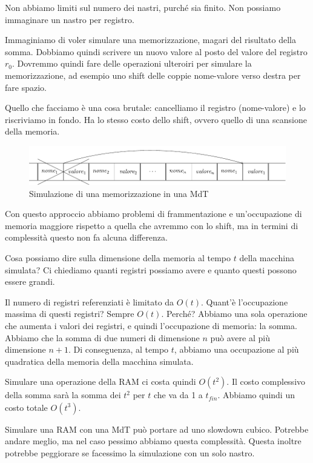 Non abbiamo limiti sul numero dei nastri, purché sia finito. Non possiamo immaginare un nastro per
registro.

Immaginiamo di voler simulare una memorizzazione, magari del risultato della somma. Dobbiamo quindi
scrivere un nuovo valore al posto del valore del registro $r_{0}$. Dovremmo quindi fare delle
operazioni ulteroiri per simulare la memorizzazione, ad esempio uno shift delle coppie nome-valore
verso destra per fare spazio.

Quello che facciamo è una cosa brutale: cancelliamo il registro (nome-valore) e lo riscriviamo in
fondo. Ha lo stesso costo dello shift, ovvero quello di una scansione della memoria.

\begin{figure}[h]
    \begin{center}
        \includegraphics[scale=0.75]{./img/deterministic_complexity_classes/RAMstore.pdf}
        \caption{Simulazione di una memorizzazione in una MdT}
    \end{center}
\end{figure}

Con questo approccio abbiamo problemi di frammentazione e un'occupazione di memoria maggiore
rispetto a quella che avremmo con lo shift, ma in termini di complessità questo non fa alcuna
differenza.

Cosa possiamo dire sulla dimensione della memoria al tempo $t$ della macchina simulata? Ci chiediamo
quanti registri possiamo avere e quanto questi possono essere grandi.

Il numero di registri referenziati è limitato da $O(t)$. Quant'è l'occupazione massima di questi
registri? Sempre $O(t)$. Perché? Abbiamo una sola operazione che aumenta i valori dei registri, e
quindi l'occupazione di memoria: la somma. Abbiamo che la somma di due numeri di dimensione $n$ può
avere al più dimensione $n+1$. Di conseguenza, al tempo $t$, abbiamo una occupazione al più
quadratica della memoria della macchina simulata.

Simulare una operazione della RAM ci costa quindi $O(t^{2})$. Il costo complessivo della somma sarà
la somma dei $t^{2}$ per $t$ che va da 1 a $t_{\textit{fin}}$. Abbiamo quindi un costo totale
$O(t^{3})$.

Simulare una RAM con una MdT può portare ad uno slowdown cubico. Potrebbe andare meglio, ma nel
caso pessimo abbiamo questa complessità. Questa inoltre potrebbe peggiorare se facessimo la
simulazione con un solo nastro.

